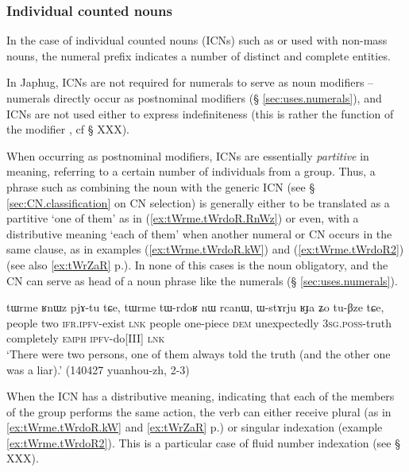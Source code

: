 \subsubsection{Individual counted nouns} \label{sec:ICN}
In the case of individual counted nouns (ICNs) such as  or  used with non-mass nouns, the numeral prefix indicates a number of distinct and complete entities.

In Japhug, ICNs are not required for numerals to serve as noun modifiers -- numerals  directly occur as postnominal modifiers (§ \ref{sec:uses.numerals}), and ICNs are not used either to express indefiniteness (this is rather the function of the modifier , cf  § XXX).

When occurring as postnominal modifiers, ICNs are essentially \textit{partitive} in meaning, referring to a certain number of individuals from a group. Thus, a phrase such as   combining the noun  with the generic ICN  (see §  \ref{sec:CN.classification} on CN selection) is generally either to be translated as a partitive `one of them'  as in (\ref{ex:tWrme.tWrdoR.RnWz}) or even, with a distributive meaning  `each of them' when another numeral or CN occurs in the same clause, as in examples (\ref{ex:tWrme.tWrdoR.kW}) and (\ref{ex:tWrme.tWrdoR2}) (see also \ref{ex:tWrZaR} p.\pageref{ex:tWrZaR}). In none of this cases is the noun   obligatory, and the CN can serve as head of a noun phrase like the numerals (§ \ref{sec:uses.numerals}).

\begin{exe}
\ex \label{ex:tWrme.tWrdoR.RnWz}
\gll tɯrme ʁnɯz pjɤ-tu tɕe, tɯrme tɯ-rdoʁ nɯ rcanɯ, ɯ-stɤrju ʁɟa ʑo tu-βze tɕe, \\
people two \textsc{ifr}.\textsc{ipfv}-exist \textsc{lnk} people one-piece \textsc{dem} unexpectedly \textsc{3sg}.\textsc{poss}-truth completely \textsc{emph} \textsc{ipfv}-do[III] \textsc{lnk} \\
\glt `There were two persons, one of them always told the truth (and the other one was a liar).' (140427 yuanhou-zh, 2-3)
\end{exe} 

When the ICN has a distributive meaning, indicating that each of the members of the group performs the same action, the verb can either receive plural (as in \ref{ex:tWrme.tWrdoR.kW} and \ref{ex:tWrZaR} p.\pageref{ex:tWrZaR}) or singular indexation (example \ref{ex:tWrme.tWrdoR2}). This is a particular case of fluid number indexation (see § XXX).

